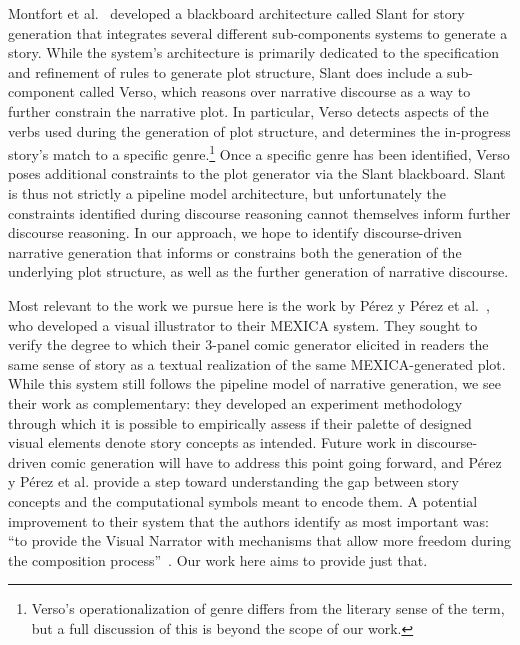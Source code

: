 Montfort et al.~\cite{montfort2013slant} developed a blackboard
architecture called Slant for story generation that integrates several
different sub-components systems to generate a story. While the system's
architecture is primarily dedicated to the specification and refinement of
rules to generate plot structure, Slant does include a sub-component called
Verso, which reasons over narrative discourse as a way to further constrain
the narrative plot. In particular, Verso detects aspects of the verbs used
during the generation of plot structure, and determines the in-progress
story's match to a specific genre.\footnote{Verso's operationalization of
genre differs from the literary sense of the term, but a full discussion of
this is beyond the scope of our work.} Once a specific genre has been
identified, Verso poses additional constraints to the plot generator via
the Slant blackboard. Slant is thus not strictly a pipeline model
architecture, but unfortunately the constraints identified during discourse
reasoning cannot themselves inform further discourse reasoning. In our
approach, we hope to identify discourse-driven narrative generation that
informs or constrains both the generation of the underlying plot structure,
as well as the further generation of narrative discourse.

Most relevant to the work we pursue here is the work by
P\'erez y P\'erez et al.~\cite{perezyperez2012illustrating}, who developed a visual illustrator to their
MEXICA system. They sought to verify the degree to which their 3-panel comic 
generator elicited in readers the same sense of story as a textual realization 
of the same MEXICA-generated plot. While this system still follows the pipeline
model of narrative generation, we see their work as complementary: they developed 
an experiment methodology through which it is possible to empirically assess if
their palette of designed visual elements denote story concepts as intended. 
Future work in discourse-driven comic generation will have to address this
point going forward, and P\'erez y P\'erez et al. provide a step
toward understanding the gap between story concepts and the computational symbols
meant to encode them. A potential improvement to their system that the authors 
identify as most important was: ``to provide the Visual Narrator with mechanisms
that allow more freedom during the composition 
process''~\cite{perezyperez2012illustrating}. Our work here aims to provide just 
that.



